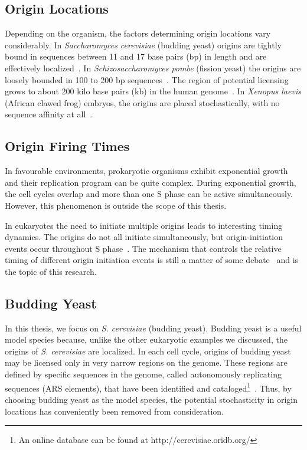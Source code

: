 	
		\subsection{Origin Locations}
		\label{subsec:OriginLocations}
		
		Depending on the organism, the factors determining origin locations vary considerably.
		In \emph{Saccharomyces cerevisiae} (budding yeast) origins are tightly bound in sequences between 11 and 17 base pairs (bp) in length and are effectively localized~\cite{ScottsPaper}.
		In \emph{Schizosaccharomyces pombe} (fission yeast) the origins are loosely bounded in 100 to 200 bp sequences~\cite{OriginsReview}.
		The region of potential licensing grows to about 200 kilo base pairs (kb) in the human genome~\cite{HumanGenome}.
		In \emph{Xenopus laevis} (African clawed frog) embryos, the origins are placed stochastically, with no sequence affinity at all~\cite{FrogEmbryo}.
		
		
		\subsection{Origin Firing Times}
		\label{subsec:OriginTimes}
		
		In favourable environments, prokaryotic organisms exhibit exponential growth and their replication program can be quite complex.
		During exponential growth, the cell cycles overlap and more than one S phase can be active simultaneously.~\cite{ExponentialGrowth}
		However, this phenomenon is outside the scope of this thesis.
		
		In eukaryotes the  need to initiate multiple origins leads to interesting timing dynamics.
		The origins do not all initiate simultaneously, but origin-initiation events occur throughout S phase~\cite{DNAInitiation}.
		The mechanism that controls the relative timing of different origin initiation events is still a matter of some debate~\cite{ScottsPaper,Bechhoefer2012374,deMouraModel1,deMouraModel2} and is the topic of this research.
		
		
		\subsection{Budding Yeast}
		\label{subsec:BuddingYeast}
		
		In this thesis, we focus on \emph{S. cerevisiae} (budding yeast).
		Budding yeast is a useful model species because, unlike the other eukaryotic examples we discussed, the origins of \emph{S. cerevisiae} are localized.
		In each cell cycle, origins of budding yeast may be licensed only in very narrow regions on the genome.
		These regions are defined by specific sequences in the genome, called autonomously replicating sequences (ARS elements), that have been identified and cataloged\footnote{An online database can be found at http://cerevisiae.oridb.org/}~\cite{OriDB}.
		Thus, by choosing budding yeast as the model species, the potential stochasticity in origin locations has conveniently been removed from consideration.
		
